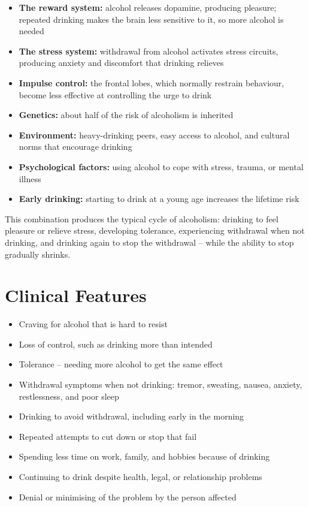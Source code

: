 \begin{itemize}
    \item \textbf{The reward system:} alcohol releases dopamine, producing pleasure; repeated drinking makes the brain less sensitive to it, so more alcohol is needed
    \item \textbf{The stress system:} withdrawal from alcohol activates stress circuits, producing anxiety and discomfort that drinking relieves
    \item \textbf{Impulse control:} the frontal lobes, which normally restrain behaviour, become less effective at controlling the urge to drink
    \item \textbf{Genetics:} about half of the risk of alcoholism is inherited
    \item \textbf{Environment:} heavy-drinking peers, easy access to alcohol, and cultural norms that encourage drinking
    \item \textbf{Psychological factors:} using alcohol to cope with stress, trauma, or mental illness
    \item \textbf{Early drinking:} starting to drink at a young age increases the lifetime risk
\end{itemize}

This combination produces the typical cycle of alcoholism: drinking to feel pleasure or relieve stress, developing tolerance, experiencing withdrawal when not drinking, and drinking again to stop the withdrawal -- while the ability to stop gradually shrinks.

\section*{Clinical Features}
\begin{itemize}
    \item Craving for alcohol that is hard to resist
    \item Loss of control, such as drinking more than intended
    \item Tolerance -- needing more alcohol to get the same effect
    \item Withdrawal symptoms when not drinking: tremor, sweating, nausea, anxiety, restlessness, and poor sleep
    \item Drinking to avoid withdrawal, including early in the morning
    \item Repeated attempts to cut down or stop that fail
    \item Spending less time on work, family, and hobbies because of drinking
    \item Continuing to drink despite health, legal, or relationship problems
    \item Denial or minimising of the problem by the person affected
\end{itemize}

